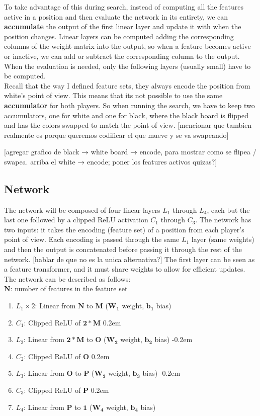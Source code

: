 To take advantage of this during search, instead of computing all the features active in a position and then evaluate the network in its entirety, we can \textbf{accumulate} the output of the first linear layer and update it with when the position changes. Linear layers can be computed adding the corresponding columns of the weight matrix into the output, so when a feature becomes active or inactive, we can add or subtract the corresponding column to the output. When the evaluation is needed, only the following layers (usually small) have to be computed. \\

Recall that the way I defined feature sets, they always encode the position from white's point of view. This means that its not possible to use the same \textbf{accumulator} for both players. So when running the search, we have to keep two accumulators, one for white and one for black, where the black board is flipped and has the colors swapped to match the point of view.
[mencionar que tambien realmente es porque queremos codificar el que mueve y se va swapeando]

[agregar grafico de black → white board → encode, para mostrar como se flipea / swapea. arriba el white → encode; poner los features activos quizas?]

\subsection{Network}

The network will be composed of four linear layers $L_1$ through $L_4$, each but the last one followed by a clipped ReLU activation $C_1$ through $C_3$. The network has two inputs: it takes the encoding (feature set) of a position from each player's point of view. Each encoding is passed through the same $L_1$ layer (same weights) and then the output is concatenated before passing it through the rest of the network. [hablar de que no es la unica alternativa?] The first layer can be seen as a feature transformer, and it must share weights to allow for efficient updates. The network can be described as follows: \\

$\bm{N}$: number of features in the feature set

\begin{enumerate}
\itemsep-0.2em
\item $L_1 \times 2$: Linear from $\bm{N}$ to $\bm{M}$ ($\bm{W_1}$ weight, $\bm{b_1}$ bias)
\item $C_1$: Clipped ReLU of $\bm{2 * M}$
\itemsep0.2em
\item $L_2$: Linear from $\bm{2 * M}$ to $\bm{O}$ ($\bm{W_2}$ weight, $\bm{b_2}$ bias)
\itemsep-0.2em
\item $C_2$: Clipped ReLU of $\bm{O}$
\itemsep0.2em
\item $L_3$: Linear from $\bm{O}$ to $\bm{P}$ ($\bm{W_3}$ weight, $\bm{b_3}$ bias)
\itemsep-0.2em
\item $C_3$: Clipped ReLU of $\bm{P}$
\itemsep0.2em
\item $L_4$: Linear from $\bm{P}$ to $\bm{1}$ ($\bm{W_4}$ weight, $\bm{b_4}$ bias)
\end{enumerate}


